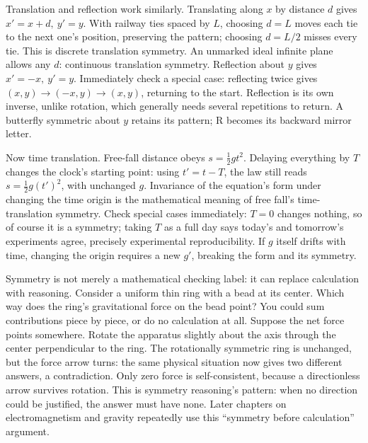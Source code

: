 Translation and reflection work similarly. Translating along \(x\) by distance \(d\) gives \(x'=x+d,\ y'=y\). With railway ties spaced by \(L\), choosing \(d=L\) moves each tie to the next one's position, preserving the pattern; choosing \(d=L/2\) misses every tie. This is discrete translation symmetry. An unmarked ideal infinite plane allows any \(d\): continuous translation symmetry. Reflection about \(y\) gives \(x'=-x,\ y'=y\). Immediately check a special case: reflecting twice gives \((x,y)\to(-x,y)\to(x,y)\), returning to the start. Reflection is its own inverse, unlike rotation, which generally needs several repetitions to return. A butterfly symmetric about \(y\) retains its pattern; R becomes its backward mirror letter.

Now time translation. Free-fall distance obeys \(s=\frac{1}{2}gt^2\). Delaying everything by \(T\) changes the clock's starting point: using \(t'=t-T\), the law still reads \(s=\frac{1}{2}g(t')^2\), with unchanged \(g\). Invariance of the equation's form under changing the time origin is the mathematical meaning of free fall's time-translation symmetry. Check special cases immediately: \(T=0\) changes nothing, so of course it is a symmetry; taking \(T\) as a full day says today's and tomorrow's experiments agree, precisely experimental reproducibility. If \(g\) itself drifts with time, changing the origin requires a new \(g'\), breaking the form and its symmetry.

Symmetry is not merely a mathematical checking label: it can replace calculation with reasoning. Consider a uniform thin ring with a bead at its center. Which way does the ring's gravitational force on the bead point? You could sum contributions piece by piece, or do no calculation at all. Suppose the net force points somewhere. Rotate the apparatus slightly about the axis through the center perpendicular to the ring. The rotationally symmetric ring is unchanged, but the force arrow turns: the same physical situation now gives two different answers, a contradiction. Only zero force is self-consistent, because a directionless arrow survives rotation. This is symmetry reasoning's pattern: when no direction could be justified, the answer must have none. Later chapters on electromagnetism and gravity repeatedly use this ``symmetry before calculation'' argument.

